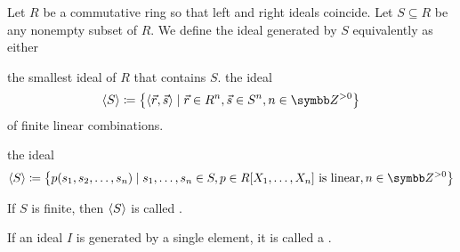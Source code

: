 \begin{definition}\label{def:generated_ring_ideal}
  Let \( R \) be a commutative ring so that left and right ideals coincide. Let \( S \subseteq R \) be any nonempty subset of \( R \). We define the ideal generated by \( S \) equivalently as either
  \begin{defenum}
     the smallest ideal of \( R \) that contains \( S \).
     the ideal
    \begin{equation*}
      \Gen S \coloneqq \left\{ \Prod {\vec r} {\vec s} \mid \vec r \in R^n, \vec s \in S^n, n \in \Z^{>0} \right\}
    \end{equation*}
    of finite linear combinations.

     the ideal
    \begin{equation*}
      \Gen S \coloneqq \left\{ p(s_1, s_2, \ldots, s_n) \mid s_1, \ldots, s_n \in S, p \in R[X_1, \ldots, X_n] \text{ is linear}, n \in \Z^{>0} \right\}
    \end{equation*}
  \end{defenum}

  If \( S \) is finite, then \( \left\langle S \right\rangle \) is called .
\end{definition}

\begin{definition}\label{def:principal_ideal}
  If an ideal \( I \) is generated by a single element, it is called a .
\end{definition}
